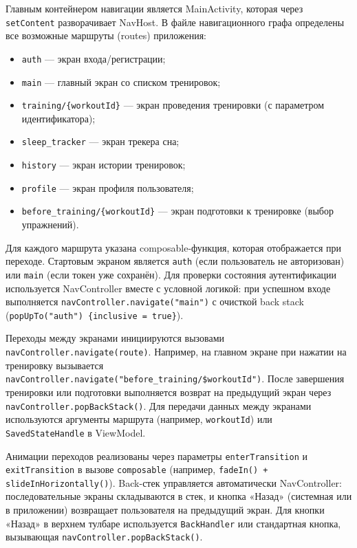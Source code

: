 Главным контейнером навигации является MainActivity, которая через \texttt{setContent} разворачивает NavHost. В файле навигационного графа определены все возможные маршруты (routes) приложения:
\begin{itemize}
    \item \texttt{auth} — экран входа/регистрации;
    \item \texttt{main} — главный экран со списком тренировок;
    \item \texttt{training/\{workoutId\}} — экран проведения тренировки (с параметром идентификатора);
    \item \texttt{sleep\_tracker} — экран трекера сна;
    \item \texttt{history} — экран истории тренировок;
    \item \texttt{profile} — экран профиля пользователя;
    \item \texttt{before\_training/\{workoutId\}} — экран подготовки к тренировке (выбор упражнений).
\end{itemize}

Для каждого маршрута указана composable-функция, которая отображается при переходе. Стартовым экраном является \texttt{auth} (если пользователь не авторизован) или \texttt{main} (если токен уже сохранён). Для проверки состояния аутентификации используется NavController вместе с условной логикой: при успешном входе выполняется \texttt{navController.navigate("main")} с очисткой back stack (\texttt{popUpTo("auth") \{inclusive = true\}}).

Переходы между экранами инициируются вызовами \texttt{navController.navigate(route)}. Например, на главном экране при нажатии на тренировку вызывается \texttt{navController.navigate("before\_training/\$workoutId")}. После завершения тренировки или подготовки выполняется возврат на предыдущий экран через \texttt{navController.popBackStack()}. Для передачи данных между экранами используются аргументы маршрута (например, \texttt{workoutId}) или \texttt{SavedStateHandle} в ViewModel.

Анимации переходов реализованы через параметры \texttt{enterTransition} и \texttt{exitTransition} в вызове \texttt{composable} (например, \texttt{fadeIn() + slideInHorizontally()}). Back-стек управляется автоматически NavController: последовательные экраны складываются в стек, и кнопка «Назад» (системная или в приложении) возвращает пользователя на предыдущий экран. Для кнопки «Назад» в верхнем тулбаре используется \texttt{BackHandler} или стандартная кнопка, вызывающая \texttt{navController.popBackStack()}.

